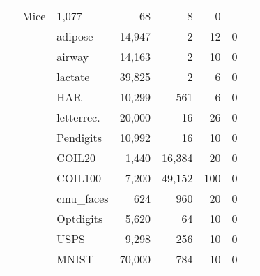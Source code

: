 \begin{table}[h!]
{\begin{tabular}{cclrrrrr}
& Mice & 1,077 & 68 & 8 & 0 & \cite{uciRepo}\\
&& adipose & 14,947 & 2 & 12 & 0 & \cite{broad_singlecell}
\\
&& airway & 14,163 & 2 & 10 & 0 & \cite{broad_singlecell}
\\
&& lactate & 39,825 & 2 & 6 & 0 & \cite{broad_singlecell}
\\
&& HAR & 10,299 & 561 & 6 & 0 & \cite{uciRepo}\\
&& letterrec. & 20,000 & 16 & 26 & 0 & \cite{uciRepo}\\
&& Pendigits & 10,992 & 16 & 10 & 0 & \cite{uciRepo}\\
\cmidrule{2-8}
&\parbox[t]{2mm}{}
& COIL20 & 1,440 & 16,384 & 20 & 0 & \cite{source_coil20}\\
&& COIL100 & 7,200 & 49,152 & 100 & 0 & \cite{source_coil100}\\
&& cmu\_faces & 624 & 960 & 20 & 0 & \cite{uciRepo}\\
&& Optdigits & 5,620 & 64 & 10 & 0 & \cite{uciRepo}\\
&& USPS & 9,298 & 256 & 10 & 0 & \cite{usps}\\
&& MNIST & 70,000 & 784 & 10 & 0 & \cite{mnist}\\
\bottomrule
\bottomrule
\end{tabular}}
\end{table}
